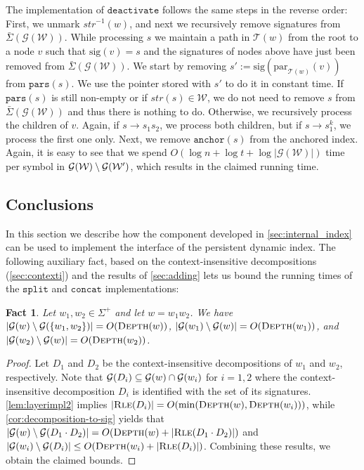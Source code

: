 \documentclass[a4paper]{article}
\newtheorem{fact}[theorem]{Fact}
\theoremstyle{remark}
\newcommand{\dactop}{\mathtt{deactivate}}
\newcommand{\concop}{\mathtt{concat}}
\newcommand{\splitop}{\mathtt{split}}
\newcommand{\sigs}{\bar{\Sigma}}
\newcommand{\depth}{\textsc{Depth}}
\newcommand{\rle}{\textsc{Rle}}
\newcommand{\grammar}{\mathcal{G}}
\newcommand{\stree}{\mathcal{T}}
\newcommand{\sstr}{\textit{str}}
\newcommand{\spar}[1]{\mathrm{par}_{\stree(#1)}}
\newcommand{\spars}{\mathtt{pars}}
\newcommand{\ussig}{\mathrm{sig}}
\newcommand{\coll}{\mathcal{W}}
\newcommand{\itanch}{\mathtt{anchor}}
\begin{document}
The implementation of $\dactop$ follows the same steps in the reverse order:
First, we unmark $\sstr^{-1}(w)$, and next we recursively remove signatures from $\sigs(\grammar(\coll))$.
While processing $s$ we maintain a path in $\stree(w)$ from the root to a node $v$ such that  $\ussig(v)=s$ and the signatures of nodes above have just been removed from $\sigs(\grammar(\coll))$. We start by removing $s':=\ussig(\spar{w}(v))$ from $\spars(s)$. We use the pointer stored with $s'$ to do it in constant time.
If $\spars(s)$ is still non-empty or if $\sstr(s)\in \coll$, we do not need to remove $s$ from $\sigs(\grammar(\coll))$ and thus there is nothing to do.
Otherwise, we recursively process the children of $v$.
Again, if $s\to s_1s_2$, we process both children, but if $s\to s_1^k$, we process the first one only.
Next, we remove $\itanch(s)$ from the anchored index.
Again, it is easy to see that we spend $O(\log n+\log t + \log|\grammar(\coll)|)$ time per symbol in $\grammar(\coll)\sm\grammar(\coll')$,
which results in the claimed running time.


\subsection{Conclusions}
In this section we describe how the component developed in \cref{sec:internal_index} can be used
to implement the interface of the persistent dynamic index.
The following auxiliary fact, based on the context-insensitive decompositions (\cref{sec:contexti})
and the results of \cref{sec:adding} lets us bound the running times of the $\splitop$ and $\concop$
implementations:

\begin{fact}\label{fct:persistent_index}
  Let $w_1,w_2\in \Sigma^+$ and let $w=w_1w_2$. We have $|\grammar(w)\sm \grammar(\{w_1,w_2\})| = O(\depth(w))$, $|\grammar(w_1)\sm \grammar(w)| = O(\depth(w_1))$,
and $|\grammar(w_2)\sm \grammar(w)| = O(\depth(w_2))$.
\end{fact}
\begin{proof}
Let $D_1$ and $D_2$ be the context-insensitive decompositions of $w_1$ and $w_2$, respectively.
Note that $\grammar(D_i) \sub \grammar(w)\cap \grammar(w_i)$ for $i=1,2$ where the context-insensitive decomposition $D_i$ is identified with the set
of its signatures. \cref{lem:layerimpl2} implies $|\rle(D_i)|=O(\min(\depth(w),\depth(w_i)))$, while \cref{cor:decomposition-to-sig}
yields that ${|\grammar(w)\sm {\grammar(D_1\cdot D_2)}|={O(\depth(w)+|\rle(D_1\cdot D_2)|)}}$ and \linebreak $|\grammar(w_i)\sm \grammar(D_i)|\le O(\depth(w_i)+|\rle(D_i)|)$.
Combining these results, we obtain the claimed bounds.
\end{proof}
\end{document}
